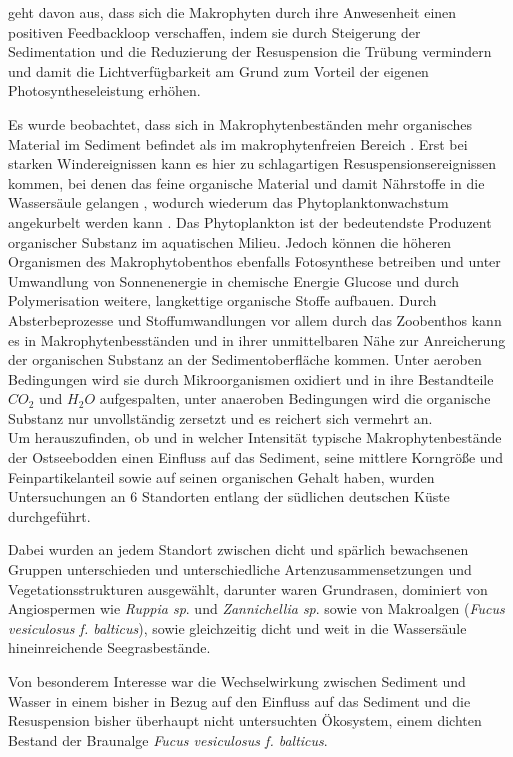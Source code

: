 \cite{madsen_2001} geht davon aus, dass sich die Makrophyten durch ihre Anwesenheit einen positiven Feedbackloop verschaffen, indem sie durch Steigerung der Sedimentation und die Reduzierung der Resuspension die Trübung vermindern und damit die Lichtverfügbarkeit am Grund zum Vorteil der eigenen Photosyntheseleistung erhöhen.

Es wurde beobachtet, dass sich in Makrophytenbeständen mehr organisches Material im Sediment befindet als im makrophytenfreien Bereich \cite{kenworthy_1982}. Erst bei starken Windereignissen kann es hier zu schlagartigen Resuspensionsereignissen kommen, bei denen das feine organische Material und damit Nährstoffe in die Wassersäule gelangen \citep{dauby_1995}, wodurch wiederum das Phytoplanktonwachstum angekurbelt werden kann \citep{cowan_1996}. 
Das Phytoplankton ist der bedeutendste Produzent organischer Substanz im aquatischen Milieu. Jedoch können die höheren Organismen des Makrophytobenthos ebenfalls Fotosynthese betreiben und unter Umwandlung von Sonnenenergie in chemische Energie Glucose und durch Polymerisation weitere, langkettige organische Stoffe aufbauen. Durch Absterbeprozesse und Stoffumwandlungen vor allem durch das Zoobenthos kann es in Makrophytenbesständen und in ihrer unmittelbaren Nähe zur Anreicherung der organischen Substanz an der Sedimentoberfläche kommen. Unter aeroben Bedingungen wird sie durch Mikroorganismen oxidiert und in ihre Bestandteile $ CO_2 $ und $ H_2O $ aufgespalten, unter anaeroben Bedingungen wird die organische Substanz nur unvollständig zersetzt und es reichert sich vermehrt an.
\\

Um herauszufinden, ob und in welcher Intensität typische Makrophytenbestände der Ostseebodden einen Einfluss auf das Sediment, seine mittlere Korngröße und Feinpartikelanteil sowie auf seinen organischen Gehalt haben, wurden Untersuchungen an 6 Standorten entlang der südlichen deutschen Küste durchgeführt.

Dabei wurden an jedem Standort zwischen dicht und spärlich bewachsenen Gruppen unterschieden und unterschiedliche Artenzusammensetzungen und Vegetationsstrukturen ausgewählt, darunter waren Grundrasen, dominiert von Angiospermen wie \textit{Ruppia sp}. und \textit{Zannichellia sp}. sowie von Makroalgen (\textit{Fucus vesiculosus f. balticus}), sowie gleichzeitig dicht und weit in die Wassersäule hineinreichende Seegrasbestände.

Von besonderem Interesse war die Wechselwirkung zwischen Sediment und Wasser in einem bisher in Bezug auf den Einfluss auf das Sediment und die Resuspension bisher überhaupt nicht untersuchten Ökosystem, einem dichten Bestand der Braunalge \textit{Fucus vesiculosus f. balticus}. 

